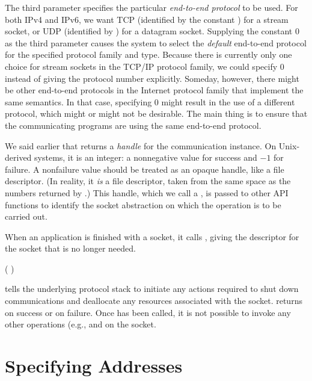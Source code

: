 The third parameter specifies the particular \emph{end-to-end
protocol} to be used. For both IPv4 and IPv6, we
want TCP (identified by the constant ) for a
stream socket, or UDP (identified by ) for a
datagram socket.  Supplying the constant 0 as the third parameter
causes the system to select the \emph{default} end-to-end protocol for
the specified protocol family and type.
Because there is currently only one choice
for stream sockets in the TCP/IP protocol family, we
could specify 0 instead of giving the protocol number explicitly.
Someday, however, there might be other end-to-end protocols in the
Internet protocol family that implement the same semantics.  In that
case, specifying 0 might result in the use of a different protocol,
which might or might not be desirable. The main thing is to ensure
that the communicating programs are using the same end-to-end
protocol.

We said earlier that  returns a \emph{handle\/} for
the communication instance.  On Unix-derived systems, it is an integer:
a nonnegative value for success and $-1$ for failure.  A nonfailure
value should be treated as an opaque handle, like a file
descriptor. (In reality, it \emph{is} a file descriptor, taken from
the same space as the numbers returned by .)  This
handle, which we call a , is passed to other
API functions to identify the socket abstraction on which the
operation is to be carried out.

When an application is finished with a socket, it calls
, giving the descriptor for the socket that is no
longer needed.

\begin{inlinefcn}
 ( )
\end{inlinefcn}

\noindent {} tells the underlying protocol stack to
initiate any actions required to shut down communications and
deallocate any resources associated with the socket.
 returns  on success or
 on failure.  Once  has been called,
it is not possible to invoke any other operations (e.g.,
 and  on the socket.

\section{Specifying Addresses}
\label{sect:specifyingAddresses}

